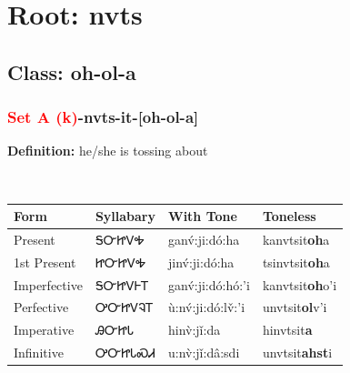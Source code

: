 \needspace{4in}
\section*{Root: nvts}
\nopagebreak
{}
\needspace{3in}
\subsection*{Class: oh-ol-a}
\nopagebreak
\needspace{2in}
\subsubsection*{\textcolor{Red}{Set A (k)}{-}\textbf{nvts}{-}it{-}[oh-ol-a]}
\nopagebreak
\textbf{Definition: } he/she is tossing about
\\[0.5em]
\begin{tabularx}{\textwidth}{l X X X}%
\toprule%
\textbf{Form}&\textbf{Syllabary}&\textbf{With Tone}&\textbf{Toneless}\\%
\midrule%
Present&ᎦᏅᏥᏙᎭ&ganv́:ji:dó:ha&kanvtsit\textbf{oh}a\\%
1st Present&ᏥᏅᏥᏙᎭ&jinv́:ji:dó:ha&tsinvtsit\textbf{oh}a\\%
Imperfective&ᎦᏅᏥᏙᎰᎢ&ganv́:ji:dó:hó:’i&kanvtsit\textbf{oh}o'i\\%
Perfective&ᎤᏅᏥᏙᎸᎢ&ù:nv́:ji:dó:lv̌:’i&unvtsit\textbf{ol}v'i\\%
Imperative&ᎯᏅᏥᏓ&hinv̀:jǐ:da&hinvtsit\textbf{a}\\%
Infinitive&ᎤᏅᏥᏓᏍᏗ&u:nv̀:jǐ:dâ:sdi&unvtsit\textbf{ahst}i\\%
\bottomrule%
\end{tabularx}
\\[1em]